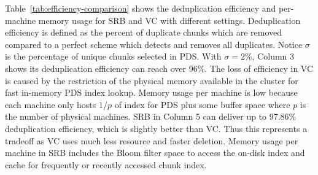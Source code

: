 Table~\ref{tab:efficiency-comparison} shows the deduplication efficiency and per-machine memory usage for SRB and VC with different 
settings.
Deduplication efficiency is defined as the percent of duplicate chunks which are removed
compared to a perfect scheme which detects and removes  all duplicates. 
Notice $\sigma$ is the percentage of unique chunks selected in PDS.
With $\sigma =2\%$, Column 3 shows its 
deduplication efficiency can 
reach over 96\%. 
The loss of efficiency in VC is caused by the restriction of the physical memory available
in the cluster for fast in-memory PDS index lookup. 
Memory usage per machine is low because each machine only hosts $1/p$  of  index for PDS 
plus some buffer space where $p$ is the number of physical machines. 
SRB in Column 5 can deliver up to 97.86\% deduplication efficiency, which is slightly better than VC.
Thus this represents a tradeoff as VC uses much less resource  and faster deletion.
Memory usage per machine in SRB includes the Bloom filter space to access the on-disk index
and  cache for frequently or recently accessed chunk index.  

